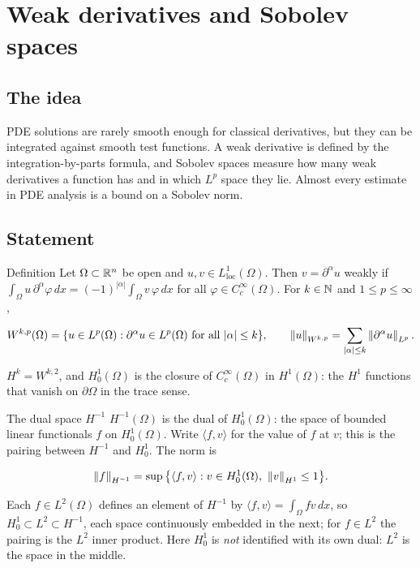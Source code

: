 
\section{Weak derivatives and Sobolev spaces}\label{p:sobolev-spaces}

\subsection*{The idea}

PDE solutions are rarely smooth enough for classical derivatives, but they can be integrated against smooth test functions. A weak derivative is defined by the integration-by-parts formula, and Sobolev spaces measure how many weak derivatives a function has and in which $L^p$ space they lie. Almost every estimate in PDE analysis is a bound on a Sobolev norm.

\subsection*{Statement}

\begin{defnbox}{Definition}
%
Let $\Omega \subset \mathbb{R}^n$ be open and $u, v \in L^1_{\mathrm{loc}}(\Omega)$. Then $v = \partial^\alpha u$ weakly if $\int_\Omega u\, \partial^\alpha \varphi \,dx = (-1)^{|\alpha|}\int_\Omega v\,\varphi\,dx$ for all $\varphi \in C_c^\infty(\Omega)$. For $k \in \mathbb{N}$ and $1 \le p \le \infty$,

\[
      W^{k,p}(\Omega) = \{ u \in L^p(\Omega) : \partial^\alpha u \in L^p(\Omega) \text{ for all } |\alpha| \le k \},
      \qquad \left\lVert u\right\rVert_{W^{k,p}} = \sum_{|\alpha|\le k} \left\lVert \partial^\alpha u\right\rVert_{L^p}.
    \]

$H^k = W^{k,2}$, and $H^1_0(\Omega)$ is the closure of $C_c^\infty(\Omega)$ in $H^1(\Omega)$: the $H^1$ functions that vanish on $\partial\Omega$ in the trace sense.
\end{defnbox}

\begin{defnbox}{The dual space $H^{-1}$}
%
$H^{-1}(\Omega)$ is the dual of $H^1_0(\Omega)$: the space of bounded linear functionals $f$ on $H^1_0(\Omega)$. Write $\langle f, v\rangle$ for the value of $f$ at $v$; this is the pairing between $H^{-1}$ and $H^1_0$. The norm is

\[
      \left\lVert f\right\rVert_{H^{-1}} = \sup\big\{ \langle f, v\rangle : v \in H^1_0(\Omega),\ \left\lVert v\right\rVert_{H^1} \le 1 \big\}.
    \]

Each $f \in L^2(\Omega)$ defines an element of $H^{-1}$ by $\langle f, v\rangle = \int_\Omega f v\,dx$, so $H^1_0 \subset L^2 \subset H^{-1}$, each space continuously embedded in the next; for $f \in L^2$ the pairing is the $L^2$ inner product. Here $H^1_0$ is \emph{not} identified with its own dual: $L^2$ is the space in the middle.
\end{defnbox}

